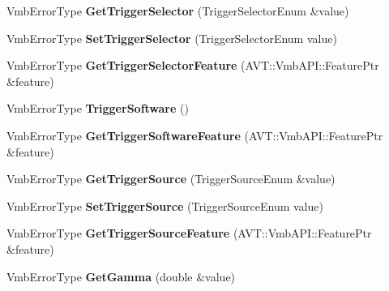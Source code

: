 \begin{DoxyCompactItemize}
\item 
\hypertarget{classMakoCamera_a9b28f29ede8c101dcbeac47fa97e84a6}{Vmb\-Error\-Type {\bfseries Get\-Trigger\-Selector} (Trigger\-Selector\-Enum \&value)}\label{classMakoCamera_a9b28f29ede8c101dcbeac47fa97e84a6}

\item 
\hypertarget{classMakoCamera_a7ef83bba07dd7cc54ac3aefa10e6057f}{Vmb\-Error\-Type {\bfseries Set\-Trigger\-Selector} (Trigger\-Selector\-Enum value)}\label{classMakoCamera_a7ef83bba07dd7cc54ac3aefa10e6057f}

\item 
\hypertarget{classMakoCamera_a4e1054b5439ec1efc3c41efd6ba0decc}{Vmb\-Error\-Type {\bfseries Get\-Trigger\-Selector\-Feature} (A\-V\-T\-::\-Vmb\-A\-P\-I\-::\-Feature\-Ptr \&feature)}\label{classMakoCamera_a4e1054b5439ec1efc3c41efd6ba0decc}

\item 
\hypertarget{classMakoCamera_ac06c97158c82839f37ae8deda14c87bd}{Vmb\-Error\-Type {\bfseries Trigger\-Software} ()}\label{classMakoCamera_ac06c97158c82839f37ae8deda14c87bd}

\item 
\hypertarget{classMakoCamera_a174f34f7f5e13fd362a532d13959c4f4}{Vmb\-Error\-Type {\bfseries Get\-Trigger\-Software\-Feature} (A\-V\-T\-::\-Vmb\-A\-P\-I\-::\-Feature\-Ptr \&feature)}\label{classMakoCamera_a174f34f7f5e13fd362a532d13959c4f4}

\item 
\hypertarget{classMakoCamera_a53f3fedf79cca3dcd5706463c637cf86}{Vmb\-Error\-Type {\bfseries Get\-Trigger\-Source} (Trigger\-Source\-Enum \&value)}\label{classMakoCamera_a53f3fedf79cca3dcd5706463c637cf86}

\item 
\hypertarget{classMakoCamera_a6928f29143def0eea99e095d2e320b91}{Vmb\-Error\-Type {\bfseries Set\-Trigger\-Source} (Trigger\-Source\-Enum value)}\label{classMakoCamera_a6928f29143def0eea99e095d2e320b91}

\item 
\hypertarget{classMakoCamera_a38e72144e2a96aa3be0c19ad5fecaea9}{Vmb\-Error\-Type {\bfseries Get\-Trigger\-Source\-Feature} (A\-V\-T\-::\-Vmb\-A\-P\-I\-::\-Feature\-Ptr \&feature)}\label{classMakoCamera_a38e72144e2a96aa3be0c19ad5fecaea9}

\item 
\hypertarget{classMakoCamera_a4ad74d73c7adfac7a40677ccc9c41a8a}{Vmb\-Error\-Type {\bfseries Get\-Gamma} (double \&value)}\label{classMakoCamera_a4ad74d73c7adfac7a40677ccc9c41a8a}


\end{DoxyCompactItemize}
